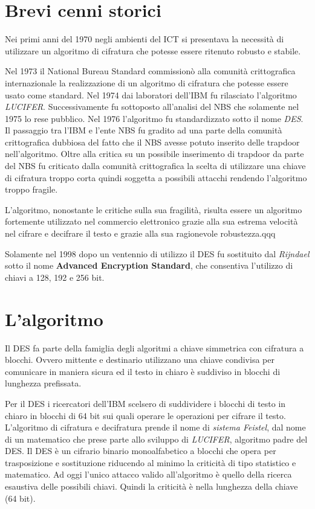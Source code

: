 \documentclass[11pt, a4paper, oneside]{Thesis} %
\begin{document}
\section{Brevi cenni storici}
Nei primi anni del 1970 negli ambienti del ICT si presentava la necessità di utilizzare un algoritmo di cifratura che potesse essere ritenuto robusto e stabile.
\par Nel 1973 il National Bureau Standard commissionò alla comunità crittografica internazionale la realizzazione di un algoritmo di cifratura che potesse essere usato come standard. 
Nel 1974 dai laboratori dell'IBM fu rilasciato l'algoritmo \emph{LUCIFER}. Successivamente fu sottoposto all'analisi del NBS che solamente nel 1975 lo rese pubblico.
Nel 1976 l'algoritmo fu standardizzato sotto il nome \emph{DES}.
Il passaggio tra l'IBM e l'ente NBS fu gradito ad una parte della comunità crittografica dubbiosa del fatto che il NBS avesse potuto inserito delle trapdoor nell'algoritmo.
Oltre alla critica su un possibile inserimento di trapdoor da parte del NBS fu criticato dalla comunità crittografica la scelta di utilizzare una chiave di cifratura troppo corta quindi soggetta
a possibili attacchi rendendo l'algoritmo troppo fragile.
\par L'algoritmo, nonostante le critiche sulla sua fragilità, risulta essere un algoritmo fortemente utilizzato nel commercio elettronico grazie alla sua estrema velocità nel cifrare e decifrare il testo
e grazie alla sua ragionevole robustezza.qqq
\par Solamente nel 1998 dopo un ventennio di utilizzo il DES fu sostituito dal \emph{Rijndael} sotto il nome \textbf{Advanced Encryption Standard}, che consentiva l'utilizzo di chiavi a 128, 192 e 256 bit.

\section{L'algoritmo}
Il DES fa parte della famiglia degli algoritmi a chiave simmetrica con cifratura a blocchi. Ovvero mittente e destinario utilizzano una chiave condivisa per comunicare in maniera sicura ed il testo in chiaro
è suddiviso in blocchi di lunghezza prefissata.
\par Per il DES i ricercatori dell'IBM scelsero di suddividere i blocchi di testo in chiaro in blocchi di 64 bit sui quali operare le operazioni per cifrare il testo.
L'algoritmo di cifratura e decifratura prende il nome di \textit{sistema Feistel}, dal nome di un matematico che prese parte allo sviluppo di \textit{LUCIFER}, algoritmo padre del DES.
Il DES è un cifrario binario monoalfabetico a blocchi che opera per trasposizione e sostituzione riducendo al minimo la criticità di tipo statistico e matematico. Ad oggi l'unico attacco valido 
all'algoritmo è quello della ricerca esaustiva delle possibili chiavi. Quindi la criticità è nella lunghezza della chiave (64 bit).
  
\end{document}
